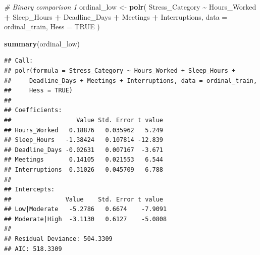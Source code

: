 \documentclass[
]{article}
\newenvironment{Shaded}{\begin{snugshade}}{\end{snugshade}}
\newcommand{\AttributeTok}[1]{\textcolor[rgb]{0.13,0.29,0.53}{#1}}
\newcommand{\CommentTok}[1]{\textcolor[rgb]{0.56,0.35,0.01}{\textit{#1}}}
\newcommand{\ConstantTok}[1]{\textcolor[rgb]{0.56,0.35,0.01}{#1}}
\newcommand{\DecValTok}[1]{\textcolor[rgb]{0.00,0.00,0.81}{#1}}
\newcommand{\FunctionTok}[1]{\textcolor[rgb]{0.13,0.29,0.53}{\textbf{#1}}}
\newcommand{\NormalTok}[1]{#1}
\newcommand{\OtherTok}[1]{\textcolor[rgb]{0.56,0.35,0.01}{#1}}
\newcommand{\SpecialCharTok}[1]{\textcolor[rgb]{0.81,0.36,0.00}{\textbf{#1}}}
\newcommand{\StringTok}[1]{\textcolor[rgb]{0.31,0.60,0.02}{#1}}
\begin{document}
\begin{Shaded}
\begin{Highlighting}[]
\CommentTok{\# Binary comparison 1}
\NormalTok{ordinal\_low }\OtherTok{\textless{}{-}} \FunctionTok{polr}\NormalTok{(}
\NormalTok{  Stress\_Category }\SpecialCharTok{\textasciitilde{}}\NormalTok{ Hours\_Worked }\SpecialCharTok{+}\NormalTok{ Sleep\_Hours }\SpecialCharTok{+}
\NormalTok{    Deadline\_Days }\SpecialCharTok{+}\NormalTok{ Meetings }\SpecialCharTok{+}\NormalTok{ Interruptions,}
  \AttributeTok{data =}\NormalTok{ ordinal\_train,}
  \AttributeTok{Hess =} \ConstantTok{TRUE}
\NormalTok{)}

\FunctionTok{summary}\NormalTok{(ordinal\_low)}
\end{Highlighting}
\end{Shaded}

\begin{verbatim}
## Call:
## polr(formula = Stress_Category ~ Hours_Worked + Sleep_Hours + 
##     Deadline_Days + Meetings + Interruptions, data = ordinal_train, 
##     Hess = TRUE)
## 
## Coefficients:
##                  Value Std. Error t value
## Hours_Worked   0.18876   0.035962   5.249
## Sleep_Hours   -1.38424   0.107814 -12.839
## Deadline_Days -0.02631   0.007167  -3.671
## Meetings       0.14105   0.021553   6.544
## Interruptions  0.31026   0.045709   6.788
## 
## Intercepts:
##               Value    Std. Error t value 
## Low|Moderate   -5.2786   0.6674    -7.9091
## Moderate|High  -3.1130   0.6127    -5.0808
## 
## Residual Deviance: 504.3309 
## AIC: 518.3309
\end{verbatim}

\begin{Shaded}
\end{Shaded}
\end{document}
